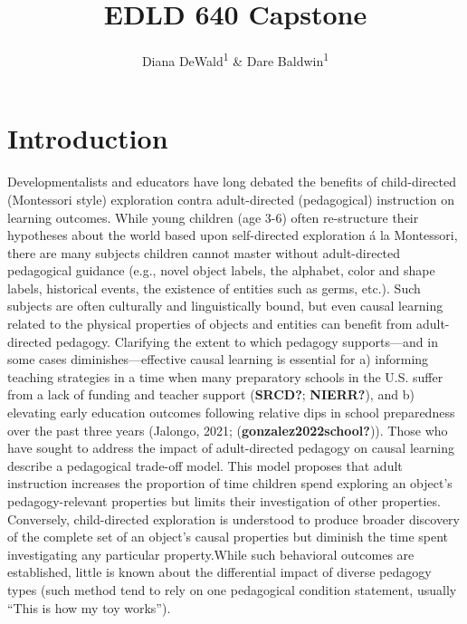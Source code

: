 \documentclass[
  english,
  man]{apa6}
\title{EDLD 640 Capstone}
\author{Diana DeWald\textsuperscript{1} \& Dare Baldwin\textsuperscript{1}}
\date{}
\affiliation{\vspace{0.5cm}\textsuperscript{1} University of Oregon}
\begin{document}
\maketitle

\hypertarget{introduction}{%
\section{Introduction}\label{introduction}}

Developmentalists and educators have long debated the benefits of child-directed (Montessori style) exploration contra adult-directed (pedagogical) instruction on learning outcomes. While young children (age 3-6) often re-structure their hypotheses about the world based upon self-directed exploration á la Montessori, there are many subjects children cannot master without adult-directed pedagogical guidance (e.g., novel object labels, the alphabet, color and shape labels, historical events, the existence of entities such as germs, etc.). Such subjects are often culturally and linguistically bound, but even causal learning related to the physical properties of objects and entities can benefit from adult-directed pedagogy. Clarifying the extent to which pedagogy supports---and in some cases diminishes---effective causal learning is essential for a) informing teaching strategies in a time when many preparatory schools in the U.S. suffer from a lack of funding and teacher support (\textbf{SRCD?}; \textbf{NIERR?}), and b) elevating early education outcomes following relative dips in school preparedness over the past three years (Jalongo, 2021; (\textbf{gonzalez2022school?})).
Those who have sought to address the impact of adult-directed pedagogy on causal learning describe a pedagogical trade-off model. This model proposes that adult instruction increases the proportion of time children spend exploring an object's pedagogy-relevant properties but limits their investigation of other properties. Conversely, child-directed exploration is understood to produce broader discovery of the complete set of an object's causal properties but diminish the time spent investigating any particular property.While such behavioral outcomes are established, little is known about the differential impact of diverse pedagogy types (such method tend to rely on one pedagogical condition statement, usually ``This is how my toy works'').
\end{document}
